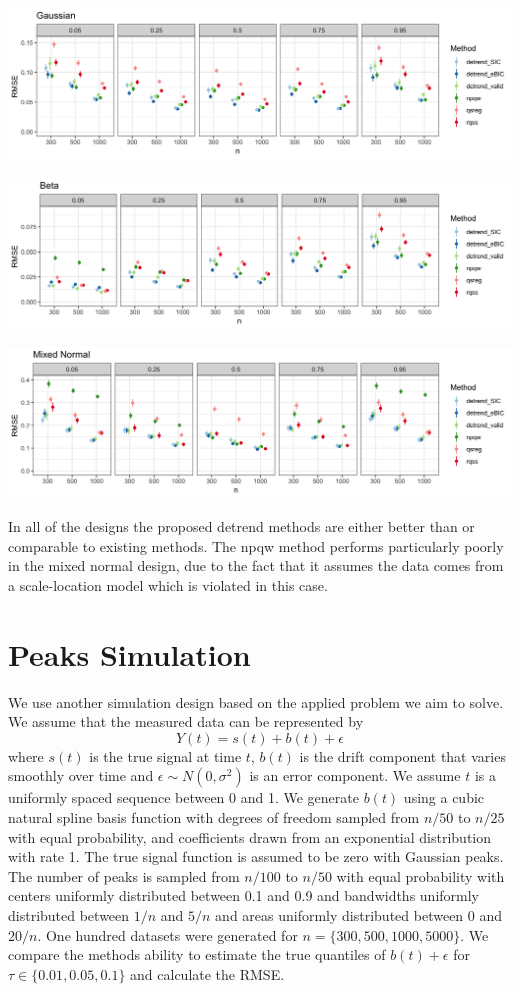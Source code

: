 \documentclass[12pt]{article}
\begin{document}
	\includegraphics[width=\linewidth]{Figures/gaus_mse.png}	
	
	\includegraphics[width=\linewidth]{Figures/shapebeta_mse.png}
	
	\includegraphics[width=\linewidth]{Figures/mixednorm_mse.png}
	
	In all of the designs the proposed detrend methods are either better than or comparable to existing methods. The npqw method performs particularly poorly in the mixed normal design, due to the fact that it assumes the data comes from a scale-location model which is violated in this case. 
	
	\section{Peaks Simulation}
	We use another simulation design based on the applied problem we aim to solve. We assume that the measured data can be represented by 
	\begin{equation}
	Y(t) = s(t) + b(t) + \epsilon
	\end{equation} 
	where $s(t)$ is the true signal at time $t$, $b(t)$ is the drift component that varies smoothly over time and $\epsilon \sim N(0, \sigma^2)$ is an error component. We assume $t$ is a uniformly spaced sequence between 0 and 1. We generate $b(t)$ using a cubic natural spline basis function with degrees of freedom sampled from $n/50$ to $n/25$ with equal probability, and coefficients drawn from an exponential distribution with rate 1. The true signal function is assumed to be zero with Gaussian peaks. The number of peaks is sampled from $n/100$ to $n/50$ with equal probability with centers uniformly distributed between 0.1 and 0.9 and bandwidths uniformly distributed between $1/n$ and $5/n$ and areas uniformly distributed between 0 and $20/n$. One hundred datasets were generated for $n=\{300, 500, 1000, 5000\}$. We compare the methods ability to estimate the true quantiles of $b(t) + \epsilon$  for $\tau \in \{0.01, 0.05, 0.1\}$ and calculate the RMSE. 
	
\end{document}
